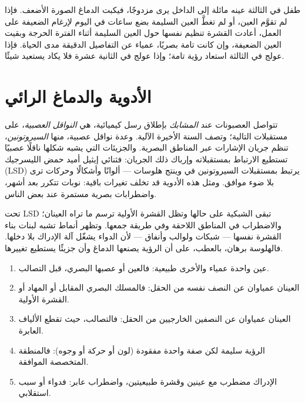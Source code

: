 \begin{example}\label{ex:g11:vision-and-brain:amblyopia}
طفل في الثالثة عينه مائلة إلى الداخل يرى مزدوجًا، فيكبت الدماغ الصورة
الأضعف. فإذا لم تقوَّم العين، أو لم تغطَّ العين السليمة بضع ساعات في
اليوم لإرغام الضعيفة على العمل، أعادت القشرة تنظيم نفسها حول العين
السليمة أثناء الفترة الحرجة وبقيت العين الضعيفة، وإن كانت تامة
بصريًا، عمياء عن التفاصيل الدقيقة مدى الحياة. فإذا عولج في الثالثة
استعاد رؤية تامة؛ وإذا عولج في الثانية عشرة فلا يكاد يستعيد شيئًا.
\end{example}

\section{الأدوية والدماغ الرائي}

\begin{proposition}\label{prop:g11:vision-and-brain:drugs}
تتواصل العصبونات عند \emph{المشابك} بإطلاق رسل كيميائية، هي
\emph{النواقل العصبية}، على مستقبلات  التالية؛ وتصف السنة
الأخيرة الآلية. وعدة نواقل عصبية، منها \emph{السيروتونين}، تنظم جريان
الإشارات عبر المناطق البصرية. والجزيئات التي يشبه شكلها ناقلًا عصبيًا
تستطيع الارتباط بمستقبلاته وإرباك ذلك الجريان: فثنائي إيثيل أميد حمض
الليسرجيك (LSD) يرتبط بمستقبلات السيروتونين في  وينتج
هلوسات --- ألوانًا وأشكالًا وحركات ترى بلا ضوء موافق. ومثل هذه الأدوية
قد تخلف تغيرات باقية: نوبات تتكرر بعد أشهر، واضطرابات بصرية مستمرة عند
بعض الناس.
\end{proposition}
\admitted

\begin{example}\label{ex:g11:vision-and-brain:hallucination}
تحت LSD تبقى الشبكية على حالها وتظل القشرة الأولية ترسم ما تراه
العينان؛ والاضطراب في المناطق اللاحقة وفي طريقة جمعها. وتظهر أنماط
تشبه لبنات بناء القشرة نفسها --- شبكات ولوالب وأنفاق --- لأن الدواء
يشغّل آلة الإدراك بلا دخلها. فالهلوسة برهان، بالعطب، على أن الرؤية
يصنعها الدماغ وأن جزيئًا يستطيع تغييرها.
\end{example}

\begin{method}\label{met:g11:vision-and-brain:locate}
\begin{enumerate}
  \item عين واحدة عمياء والأخرى طبيعية: فالعين أو عصبها البصري، قبل
        التصالب.
  \item العينان عمياوان عن النصف نفسه من الحقل: فالمسلك البصري المقابل
        أو المهاد أو القشرة الأولية.
  \item العينان عمياوان عن النصفين الخارجيين من الحقل: فالتصالب، حيث
        تقطع الألياف العابرة.
  \item الرؤية سليمة لكن صفة واحدة مفقودة (لون أو حركة أو وجوه):
        فالمنطقة المتخصصة الموافقة.
  \item الإدراك مضطرب مع عينين وقشرة طبيعيتين، واضطراب عابر: فدواء أو
        سبب استقلابي.
\end{enumerate}
\end{method}

